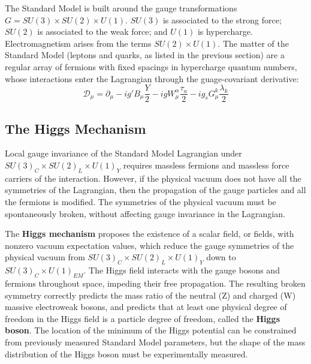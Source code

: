 \documentclass{article}
\begin{document}
The Standard Model is built around the gauge transformations $G = SU(3) \times SU(2) \times U(1)$. $SU(3)$ is associated to the strong force; $SU(2)$ is associated to the weak force; and $U(1)$ is hypercharge. Electromagnetism arises from the terms $SU(2) \times U(1)$. The matter of the Standard Model (leptons and quarks, as listed in the previous section) are a regular array of fermions with fixed spacings in hypercharge quantum numbers, whose interactions enter the Lagrangian through the guage-covariant derivative:
\begin{equation}
    \mathcal{D}_\mu = \partial_\mu - ig' B_\mu \frac{Y}{2} - ig W_{\mu}^{\alpha} \frac{\tau_a}{2} - ig_s G_\mu^{k} \frac{\lambda_k}{2}
\end{equation}

\subsection{The Higgs Mechanism}
Local gauge invariance of the Standard Model Lagrangian under $SU(3)_C \times SU(2)_L \times U(1)_Y$ requires massless fermions and massless force carriers of the interaction. However, if the physical vacuum does not have all the symmetries of the Lagrangian, then the propagation of the gauge particles and all the fermions is modified. The symmetries of the physical vacuum must be spontaneously broken, without affecting gauge invariance in the Lagrangian. 

The \textbf{Higgs mechanism} proposes the existence of a scalar field, or fields, with nonzero vacuum expectation values, which reduce the gauge symmetries of the physical vacuum from $SU(3)_C \times SU(2)_L \times U(1)_Y$ down to $SU(3)_C \times U(1)_{EM}$. The Higgs field interacts with the gauge bosons and fermions throughout space, impeding their free propagation. The resulting broken symmetry correctly predicts the mass ratio of the neutral (Z) and charged (W) massive electroweak bosons, and predicts that at least one physical degree of freedom in the Higgs field is a particle degree of freedom, called the \textbf{Higgs boson}. The location of the minimum of the Higgs potential can be constrained from previously measured Standard Model parameters, but the shape of the mass distribution of the Higgs boson must be experimentally measured.
\end{document}
